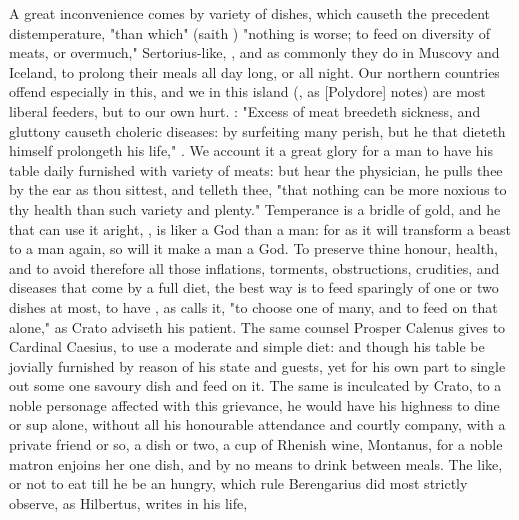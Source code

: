 {A great inconvenience comes by variety of dishes, which causeth the precedent distemperature, "than which" (saith \Avicenna) "nothing is worse; to feed on diversity of meats, or overmuch," Sertorius-like, , and as commonly they do in Muscovy and Iceland, to prolong their meals all day long, or all night. Our northern countries offend especially in this, and we in this island (, as [Polydore] notes) are most liberal feeders, but to our own hurt. : "Excess of meat breedeth sickness, and gluttony causeth choleric diseases: by surfeiting many perish, but he that dieteth himself prolongeth his life," . We account it a great glory for a man to have his table daily furnished with variety of meats: but hear the physician, he pulls thee by the ear as thou sittest, and telleth thee, "that nothing can be more noxious to thy health than such variety and plenty." Temperance is a bridle of gold, and he that can use it aright, , is liker a God than a man: for as it will transform a beast to a man again, so will it make a man a God. To preserve thine honour, health, and to avoid therefore all those inflations, torments, obstructions, crudities, and diseases that come by a full diet, the best way is to feed sparingly of one or two dishes at most, to have , as \Seneca calls it, "to choose one of many, and to feed on that alone," as Crato adviseth his patient. The same counsel Prosper Calenus gives to Cardinal Caesius, to use a moderate and simple diet: and though his table be jovially furnished by reason of his state and guests, yet for his own part to single out some one savoury dish and feed on it. The same is inculcated by Crato,  to a noble personage affected with this grievance, he would have his highness to dine or sup alone, without all his honourable attendance and courtly company, with a private friend or so, a dish or two, a cup of Rhenish wine, \etc{} Montanus,  for a noble matron enjoins her one dish, and by no means to drink between meals. The like,  or not to eat till he be an hungry, which rule Berengarius did most strictly observe, as Hilbertus,  writes in his life,

}
